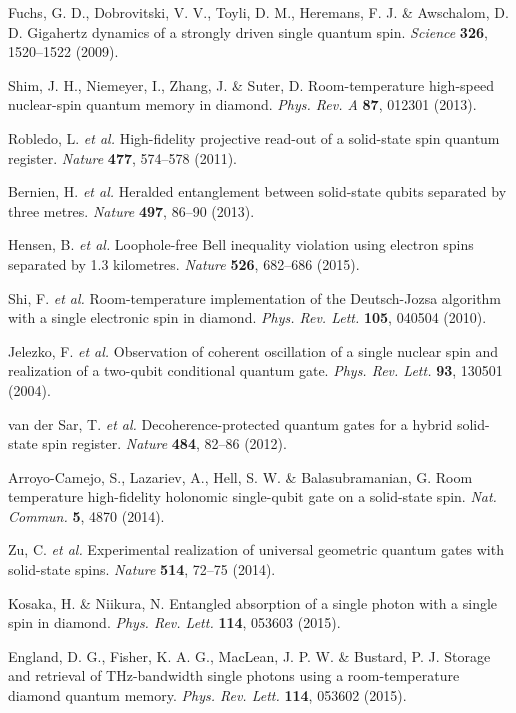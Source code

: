 \documentclass[showpacs,preprintnumbers,showkeys,amsmath,amssymb]{revtex4}%
\begin{document}
\begin{thebibliography}{61}
 Fuchs, G. D., Dobrovitski, V. V., Toyli, D. M., Heremans, F. J. \& Awschalom, D. D. Gigahertz dynamics of a strongly driven single quantum spin. \emph{Science} \textbf{326}, 1520--1522 (2009).%

 Shim, J. H., Niemeyer, I., Zhang, J. \& Suter, D. Room-temperature high-speed nuclear-spin quantum memory in diamond. \emph{Phys. Rev. A} \textbf{87}, 012301 (2013).

 Robledo, L. \emph{et al.} High-fidelity projective read-out of a solid-state spin quantum register. \emph{Nature}  \textbf{477}, 574--578 (2011).

 Bernien, H. \emph{et al.} Heralded entanglement between solid-state qubits separated by three metres. \emph{Nature} \textbf{497}, 86--90 (2013).  %

 Hensen, B. \emph{et al.} Loophole-free Bell inequality violation using electron spins separated by 1.3 kilometres. \emph{Nature} \textbf{526}, 682--686 (2015).

 Shi, F. \emph{et al.} Room-temperature implementation of the Deutsch-Jozsa algorithm with a single electronic spin in diamond. \emph{Phys. Rev. Lett.} \textbf{105}, 040504 (2010).

 Jelezko, F. \emph{et al.} Observation of coherent oscillation of a single nuclear spin and realization of a two-qubit conditional quantum gate. \emph{Phys. Rev. Lett.} \textbf{93}, 130501 (2004).

 van der Sar, T. \emph{et al.} Decoherence-protected quantum gates for a hybrid solid-state spin register. \emph{Nature} \textbf{484}, 82--86 (2012).

 Arroyo-Camejo, S.,  Lazariev, A.,  Hell, S. W. \&  Balasubramanian, G. Room temperature high-fidelity holonomic single-qubit gate on a solid-state spin. \emph{Nat. Commun.} \textbf{5}, 4870 (2014).

 Zu, C. \emph{et al.} Experimental realization of universal geometric quantum gates with solid-state spins. \emph{Nature}  \textbf{514}, 72--75 (2014).

 Kosaka, H. \& Niikura, N. Entangled absorption of a single photon with a single spin in diamond.
\emph{Phys. Rev. Lett.} \textbf{114}, 053603 (2015).

 England, D. G., Fisher, K. A. G.,  MacLean, J. P. W. \&  Bustard, P. J. Storage and retrieval of THz-bandwidth single photons using a room-temperature diamond quantum memory. \emph{Phys. Rev. Lett.} \textbf{114}, 053602 (2015).


\end{thebibliography}
\end{document}
